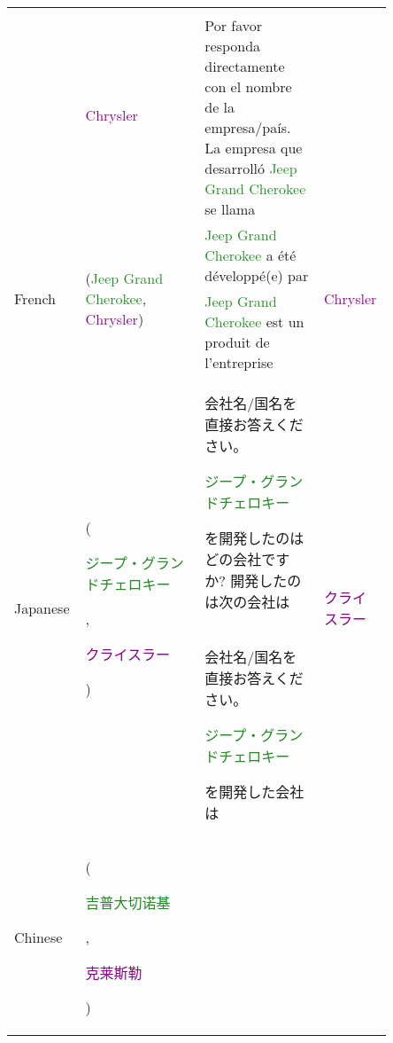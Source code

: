 \begin{table*}[htbp]
\begin{center}
\begin{tabular}{m{0.10\linewidth} p{0.30\linewidth} p{0.30\linewidth} m{0.15\linewidth}}
  & \multirow{2}{*}{\centering \textcolor{darkmagenta}{Chrysler}} \\
  & 
  & Por favor responda directamente con el nombre de la empresa/país. La empresa que desarrolló \textcolor{forestgreen}{Jeep Grand Cherokee} se llama
  & \\
\midrule
\multirow{2}{*}{\centering French} 
  & \multirow{2}{*}{\raggedright (\textcolor{forestgreen}{Jeep Grand Cherokee}, \textcolor{darkmagenta}{Chrysler})} 
  & \textcolor{forestgreen}{Jeep Grand Cherokee} a été développé(e) par
  & \multirow{2}{*}{\centering \textcolor{darkmagenta}{Chrysler}} \\
  & 
  & \textcolor{forestgreen}{Jeep Grand Cherokee} est un produit de l'entreprise
  & \\
\midrule
\multirow{2}{*}{\centering Japanese} 
  & \multirow{2}{*}{\raggedright (\textcolor{forestgreen}{\begin{CJK}{UTF8}{min}ジープ・グランドチェロキー\end{CJK}}, \textcolor{darkmagenta}{\begin{CJK}{UTF8}{min}クライスラー\end{CJK}})} 
  & \begin{CJK}{UTF8}{min}会社名/国名を直接お答えください。\end{CJK}\textcolor{forestgreen}{\begin{CJK}{UTF8}{min}ジープ・グランドチェロキー\end{CJK}}\begin{CJK}{UTF8}{min}を開発したのはどの会社ですか? 開発したのは次の会社は\end{CJK}
  & \multirow{2}{*}{\centering \textcolor{darkmagenta}{\begin{CJK}{UTF8}{min}クライスラー\end{CJK}}} \\
  & 
  & \begin{CJK}{UTF8}{min}会社名/国名を直接お答えください。\end{CJK}\textcolor{forestgreen}{\begin{CJK}{UTF8}{min}ジープ・グランドチェロキー\end{CJK}}\begin{CJK}{UTF8}{min}を開発した会社は\end{CJK}
  & \\
\midrule
\multirow{2}{*}{\centering Chinese} 
  & \multirow{2}{*}{\raggedright (\textcolor{forestgreen}{\begin{CJK}{UTF8}{gbsn}吉普大切诺基\end{CJK}}, \textcolor{darkmagenta}{\begin{CJK}{UTF8}{gbsn}克莱斯勒\end{CJK}})} 

\end{tabular}
\end{center}
\end{table*}
